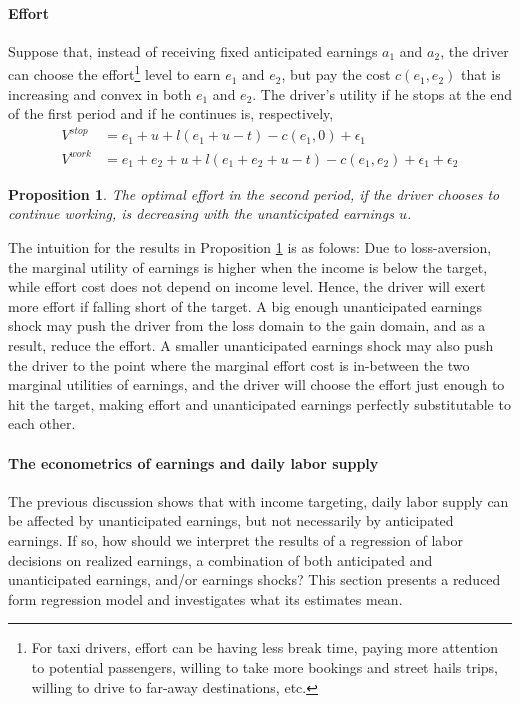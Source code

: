 \documentclass[reviewmode,AEJ]{AEA}
\newtheorem{proposition}{Proposition}
\begin{document}
\paragraph{Effort} Suppose that, instead of receiving fixed anticipated earnings $a_1$ and $a_2$, the driver 
can choose the effort\footnote{For taxi drivers, effort can be having less break time, paying more attention 
to potential passengers, willing to take more bookings and street hails trips, willing to drive to far-away 
destinations, etc.} level to earn $e_1$ and $e_2$, but pay the cost $c(e_1, e_2)$ that is increasing and convex 
in both $e_1$ and $e_2$. The driver's utility if he stops at the end of the first period and if he continues is,
respectively,
\begin{align*}
V^{stop} &= e_1 + u + l(e_1+u-t) - c(e_1,0) + \epsilon_1 \\
V^{work} &= e_1 + e_2 + u + l(e_1+e_2+u-t) - c(e_1,e_2) + \epsilon_1 + \epsilon_2   
\end{align*}


\begin{proposition}
\label{prop:effort}
The optimal effort in the second period, if the driver chooses to continue working, is decreasing with the
unanticipated earnings $u$.
\end{proposition}


The intuition for the results in Proposition \ref{prop:effort} is as folows: Due to loss-aversion, the marginal
utility of earnings is higher when the income is below the target, while effort cost does not depend on income 
level. Hence, the driver will exert more effort if falling short of the target. A big enough unanticipated
earnings shock may push the driver from the loss domain to the gain domain, and as a result, reduce the effort. 
A smaller unanticipated earnings shock may also push the driver to the point where the marginal effort cost is
in-between the two marginal utilities of earnings, and the driver will choose the effort just enough to hit 
the target, making effort and unanticipated earnings perfectly substitutable to each other.

\paragraph{The econometrics of earnings and daily labor supply} The previous discussion shows that with income
targeting, daily labor supply can be affected by unanticipated earnings, but not necessarily by anticipated
earnings. If so, how should we interpret the results of a regression of labor decisions on realized earnings, 
a combination of both anticipated and unanticipated earnings, and/or earnings shocks? This section presents 
a reduced form regression model and investigates what its estimates mean. 
\end{document}
